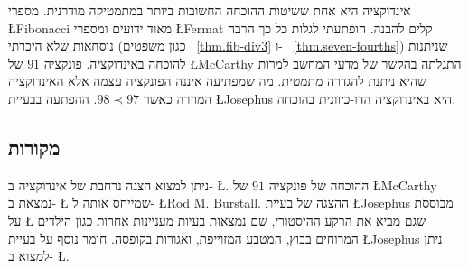 אינדוקציה היא אחת ששיטות ההוכחה החשובות ביותר במתמטיקה מודרנית. מספרי
\L{Fibonacci}
מאוד ידועים ומספרי 
\L{Fermat}
קלים להבנה. הופתעתי לגלות כל כך הרבה נוסחאות שלא היכרתי (כגון משפטים%
~\ref{thm.fib-div3}
ו-%
~\ref{thm.seven-fourths})
שניתנות להוכחה באינדוקציה. פונקציה
$91$
של
\L{McCarthy}
התגלתה בהקשר של מדעי המחשב למרות שהיא ניתנת להגדרה מתמטית. מה שמפתיעה איננה הפונקציה עצמה אלא האינדוקציה המוזרה כאשר 
$98\prec 97$. 
ההפתעה בבעיית
\L{Josephus}
היא באינדוקציה הדו-כיוונית בהוכחה.

\subsection*{מקורות}

ניתן למצוא הצגה נרחבת של אינדוקציה ב-%
\L{\cite{gunderson}}.
ההוכחה של פונקציה 
$91$
של
\L{McCarthy}
נמצאת ב-%
\L{\cite{manna}}
שמייחס אותה ל-%
\L{Rod M. Burstall}.
ההצגה של בעיית 
\L{Josephus}
מבוססת על
\L{\cite{gunderson}}
שגם מביא את הרקע ההיסטורי, שם נמצאות בעיות מעניינות אחרות כגון הילדים המרוחים בבוץ, המטבע המזוייפת, ואגורות בקופסה. חומר נוסף על בעיית
\L{Josephus}
ניתן למצוא ב-%
\L{\cite{schumer,wiki:josephus}}.
